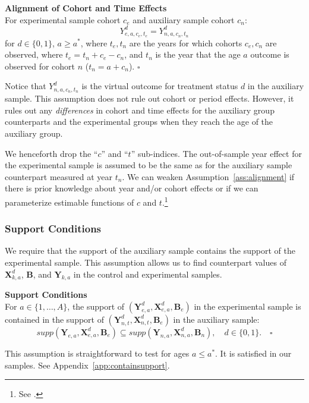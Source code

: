 \onehalfspacing
\begin{assumption}\label{ass:alignment} \textbf{Alignment of Cohort and Time Effects}\\
For experimental sample cohort $c_{e}$ and auxiliary sample cohort $c_{n}$:
\begin{equation}
Y_{e,a,c_{e},t_{e}}^d = Y_{n,a,c_{n},t_{n}}^d
\end{equation}
for $d \in \{ 0, 1\}$, $a \geq a^*$, where $t_{e}, t_{n}$ are the years for which cohorts $c_{e}, c_{n}$ are observed, where $t_e = t_n + c_e - c_n$, and $t_n$ is the year that the age $a$ outcome is observed for cohort $n$ ($t_n = a + c_n$). $\square$
\end{assumption}
\doublespacing

Notice that $Y^d_{n,a,{c_n},{t_n}}$ is the virtual outcome for treatment status $d$ in the auxiliary sample. This assumption does not rule out cohort or period effects. However, it rules out any \emph{differences} in cohort and time effects for the auxiliary group counterparts and the experimental groups when they reach the age of the auxiliary group.

We henceforth drop the ``$c$'' and ``$t$'' sub-indices. The out-of-sample year effect for the experimental sample is assumed to be the same as for the auxiliary sample counterpart measured at year $t_n$. We can weaken Assumption~\ref{ass:alignment} if there is prior knowledge about year and/or cohort effects or if we can parameterize estimable functions of $c$ and $t$.\footnote{See \cite{Heckman_Robb_1985_JE}.}

\subsubsection{Support Conditions}

We require that the support of the auxiliary sample contains the support of the experimental sample. This assumption allows us to find counterpart values of $\bm{X}^d_{k,a}$, $\bm{B}$, and $\bm{Y}_{k,a}$ in the control and experimental samples.

\onehalfspacing
\begin{assumption} \label{ass:contain} \textbf{Support Conditions} \\
For $a \in \{ 1, \ldots, A \}$, the support of $\left( \bm{Y}^d_{e,a}, \bm{X}^d_{e,a}, \bm{B}_e \right)$ in the experimental sample is contained in the support of $\left( \bm{Y}^d_{n,t}, \bm{X}^d_{n,t}, \bm{B}_e \right)$ in the auxiliary sample:
\begin{equation}
supp( \bm{Y}_{e,a}, \bm{X}^d_{e,a}, \bm{B}_e ) \subseteq supp( \bm{Y}_{n,a}, \bm{X}^d_{n,a}, \bm{B}_n ), \quad d \in \{0,1\}. \quad \square
\end{equation}
\end{assumption}
\doublespacing
This assumption is straightforward to test for ages $a\leq a^\ast$. It is satisfied in our samples. See Appendix~\ref{app:containsupport}.


